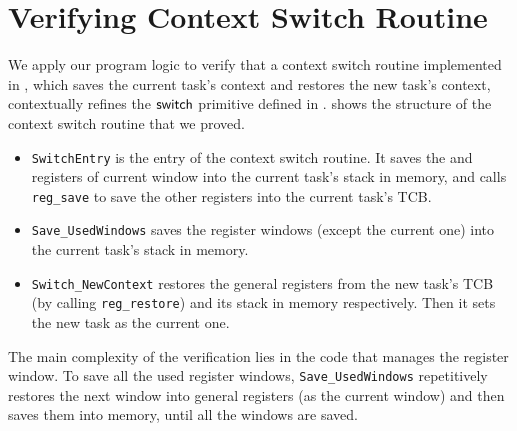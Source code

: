 \section{Verifying Context Switch Routine}
\label{sec:ctxswitch}

\indent
We apply our program logic to verify
that a context switch routine implemented in \sparc,
which saves the current task's context and
restores the new task's context,
contextually refines the $\mathsf{switch}{}$ primitive
defined in \Sec{\ref{subsec:High-level Pseudo-SPARCv8 Language}}.
\Fig{\ref{fig:The Structure of Context Switch Routine}}
shows the structure of the context switch routine that we proved.
\begin{center}
    
	\label{fig:The Structure of Context Switch Routine}
\end{center}
\begin{itemize}
    \item \texttt{SwitchEntry}
    is the entry of the context switch routine.
    It saves the \localRN{} and \inRN{} registers of current
    window into the current task's stack in memory, and calls
    \texttt{reg\_save} to save the other registers into 
    the current task's TCB.

    \item
    \texttt{Save\_UsedWindows} saves
	the register windows (except the current one)
    into the current task's stack in memory.

    \item
    \texttt{Switch\_NewContext}
    restores the general registers from the new task's TCB
    (by calling \texttt{reg\_restore})
    and its stack in memory
    respectively. Then it sets the new task as
    the current one.
\end{itemize}

The main complexity of the verification lies in
the code that manages the register window.
To save all the used
register windows, \texttt{Save\_UsedWindows}
repetitively restores the next window into general registers
(as the current window)
and then saves them into memory, until all the windows are saved.

